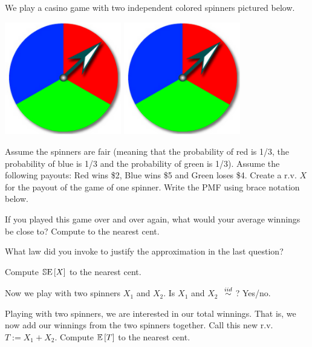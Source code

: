 \documentclass[12pt]{article}
\begin{document}
\eenum

\problem We play a casino game with two independent colored spinners pictured below.

\begin{center}
\includegraphics[width=2in]{spinner.png} \includegraphics[width=2in]{spinner.png}
\end{center}

\benum

 Assume the spinners are fair (meaning that the probability of red is 1/3, the probability of blue is 1/3 and the probability of green is 1/3). Assume the following payouts: Red wins \$2, Blue wins \$5 and Green loses \$4. Create a r.v. $X$ for the payout of the game of one spinner. Write the PMF using brace notation below. 

 If you played this game over and over again, what would your average winnings be close to? Compute to the nearest cent. 

 What law did you invoke to justify the approximation in the last question? 

 Compute $\mathbb{S}\text{E}\left[X\right]$ to the nearest cent. 

 Now we play with two spinners $X_1$ and $X_2$. Is $X_1$ and $X_2$ $\iid$? Yes/no. 

 Playing with two spinners, we are interested in our total winnings. That is, we now add our winnings from the two spinners together. Call this new r.v. $T := X_1 + X_2$. Compute $\mathbb{E}\left[T\right]$ to the nearest cent. 
\end{document}
